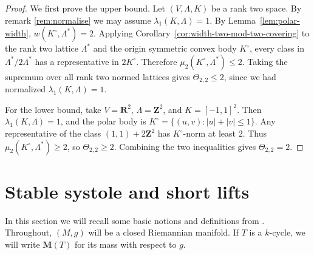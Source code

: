\documentclass[11pt,reqno]{amsart}
\numberwithin{equation}{section}
\numberwithin{equation}{section}
\theoremstyle{definition}
\newcommand{\R}{\mathbf R}
\newcommand{\Z}{\mathbf Z}
\begin{document}
\begin{proof}
We first prove the upper bound. Let \((V,\Lambda,K)\) be a rank two space. By  remark \ref{rem:normalise} we may assume \(\lambda_1(K,\Lambda)=1\). By Lemma~\ref{lem:polar-width}, \(w(K^\circ,\Lambda^\ast)=2\). Applying Corollary~\ref{cor:width-two-mod-two-covering} to the rank two lattice \(\Lambda^\ast\) and the origin symmetric convex body \(K^\circ\), every class in \(\Lambda^\ast/2\Lambda^\ast\) has a representative in \(2K^\circ\). Therefore \(\mu_2(K^\circ,\Lambda^\ast)\le2\). Taking the supremum over all rank two normed lattices gives \(\Theta_{2,2}\le2\), since we had normalized \(\lambda_1(K,\Lambda)=1\).

For the lower bound, take \(V=\R^2\), \(\Lambda=\Z^2\), and \(K=[-1,1]^2\). Then \(\lambda_1(K,\Lambda)=1\), and the polar body is \(K^\circ=\{(u,v): |u|+|v|\le1\}\). Any representative of the class \((1,1)+2\Z^2\) has \(K^\circ\)-norm at least \(2\). Thus \(\mu_2(K^\circ,\Lambda^\ast)\ge2\), so \(\Theta_{2,2}\ge2\). Combining the two inequalities gives \(\Theta_{2,2}=2\).
\end{proof}

\section{Stable systole and short lifts}
In this section we will recall some basic notions and definitions from \cite{Federer}. Throughout, \((M,g)\) will be a closed Riemannian manifold. If \(T\) is a $k$-cycle, we will write \(\mathbf M(T)\) for its mass with respect to \(g\). 
\end{document}
